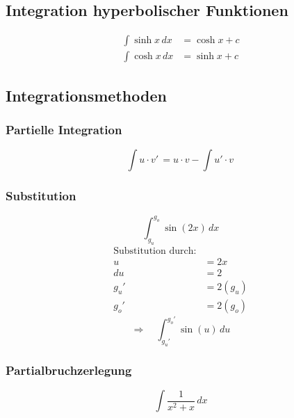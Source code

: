 \subsection{Integration hyperbolischer Funktionen}
\begin{align}
  \int\sinh{x}\,dx &= \cosh{x}+c \\
  \int\cosh{x}\,dx &= \sinh{x}+c
\end{align}


\subsection{Integrationsmethoden}

\subsubsection{Partielle Integration}
\begin{equation}
\int u\cdot v'\, = u\cdot v - \int u' \cdot v \,
\end{equation}

\subsubsection{Substitution}
\begin{equation*}
  \int_{g_u}^{g_o} \sin(2x)\,dx
\end{equation*}
\begin{align*}
\text{Substitution durch:} & \\
u &= 2x \\
du &= 2 \\
g_u' &= 2(g_u) \\
g_o' &= 2(g_o)
\end{align*}
\begin{equation}
\Longrightarrow \quad \int_{g_u'}^{g_o'} \sin(u)\,du
\end{equation}

\subsubsection{Partialbruchzerlegung}
\begin{equation}
\int \frac{1}{x^2 + x}\,dx
\end{equation}

